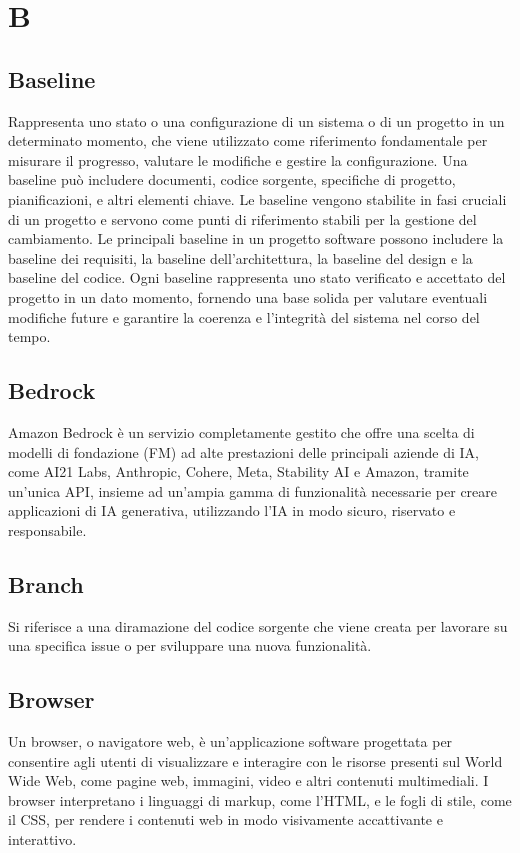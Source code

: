 \documentclass{article}
\begin{document}
\section{B}
\subsection{Baseline}
Rappresenta uno stato o una configurazione di un sistema o di un progetto in un determinato momento, che viene utilizzato come riferimento fondamentale per misurare il progresso, valutare le modifiche e gestire la configurazione. Una baseline può includere documenti, codice sorgente, specifiche di progetto, pianificazioni, e altri elementi chiave.
Le baseline vengono stabilite in fasi cruciali di un progetto e servono come punti di riferimento stabili per la gestione del cambiamento. Le principali baseline in un progetto software possono includere la baseline dei requisiti, la baseline dell'architettura, la baseline del design e la baseline del codice. Ogni baseline rappresenta uno stato verificato e accettato del progetto in un dato momento, fornendo una base solida per valutare eventuali modifiche future e garantire la coerenza e l'integrità del sistema nel corso del tempo.

\subsection{Bedrock}
Amazon Bedrock è un servizio completamente gestito che offre una scelta di modelli di fondazione (FM) ad alte prestazioni delle principali aziende di IA, come AI21 Labs, Anthropic, Cohere, Meta, Stability AI e Amazon, tramite un'unica API, insieme ad un'ampia gamma di funzionalità necessarie per creare applicazioni di IA generativa, utilizzando l'IA in modo sicuro, riservato e responsabile.

\subsection{Branch}
Si riferisce a una diramazione del codice sorgente che viene creata per lavorare su una specifica issue o per sviluppare una nuova funzionalità.

\subsection{Browser}
Un browser, o navigatore web, è un'applicazione software progettata per consentire agli utenti di visualizzare e interagire con le risorse presenti sul World Wide Web, come pagine web, immagini, video e altri contenuti multimediali. I browser interpretano i linguaggi di markup, come l'HTML, e le fogli di stile, come il CSS, per rendere i contenuti web in modo visivamente accattivante e interattivo.
\end{document}
